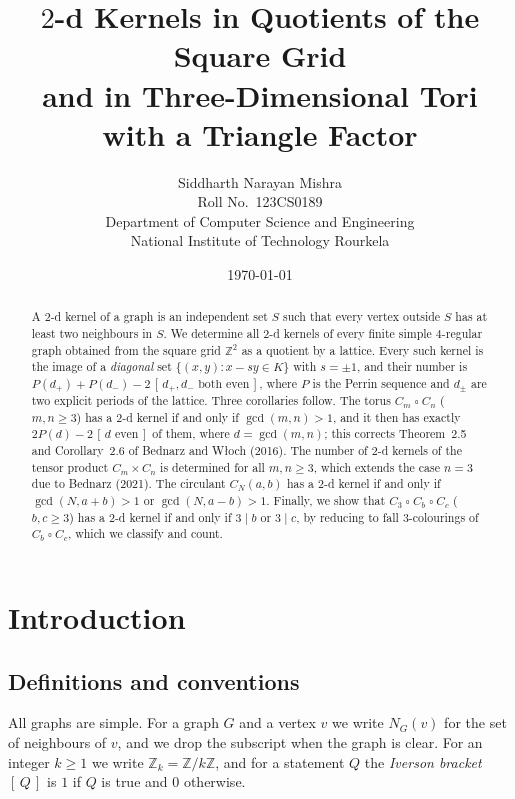 \documentclass[11pt]{article}
\title{$2$-d Kernels in Quotients of the Square Grid\\
and in Three-Dimensional Tori with a Triangle Factor}
\author{%
  Siddharth Narayan Mishra\\[0.2em]
  \small Roll No.\ 123CS0189\\
  \small Department of Computer Science and Engineering\\
  \small National Institute of Technology Rourkela%
}
\date{\today}
\theoremstyle{plain}
\theoremstyle{definition}
\theoremstyle{remark}
\newcommand{\Z}{\mathbb{Z}}
\newcommand{\T}{\mathbin{\square}}
\newcommand{\Per}{P}
\newcommand{\Iv}[1]{[\,#1\,]}
\begin{document}
\maketitle

\begin{abstract}
A $2$-d kernel of a graph is an independent set $S$ such that every vertex outside $S$ has
at least two neighbours in $S$. We determine all $2$-d kernels of every finite simple
$4$-regular graph obtained from the square grid $\Z^2$ as a quotient by a lattice. Every
such kernel is the image of a \emph{diagonal} set $\{(x,y) : x - sy \in K\}$ with
$s = \pm 1$, and their number is
$\Per(d_{+}) + \Per(d_{-}) - 2\,\Iv{d_{+}, d_{-} \text{ both even}}$, where $\Per$ is the
Perrin sequence and $d_{\pm}$ are two explicit periods of the lattice. Three corollaries
follow. The torus $C_m \T C_n$ ($m,n \ge 3$) has a $2$-d kernel if and only if
$\gcd(m,n) > 1$, and it then has exactly $2\Per(d) - 2\,\Iv{d \text{ even}}$ of them, where
$d = \gcd(m,n)$; this corrects Theorem~2.5 and Corollary~2.6 of Bednarz and W{\l}och
(2016). The number of $2$-d kernels of the tensor product $C_m \times C_n$ is determined for
all $m,n \ge 3$, which extends the case $n = 3$ due to Bednarz (2021). The circulant
$C_N(a,b)$ has a $2$-d kernel if and only if $\gcd(N, a+b) > 1$ or $\gcd(N, a-b) > 1$.
Finally, we show that $C_3 \T C_b \T C_c$ ($b, c \ge 3$) has a $2$-d kernel if and only if
$3 \mid b$ or $3 \mid c$, by reducing to fall $3$-colourings of $C_b \T C_c$, which we
classify and count.
\end{abstract}

\tableofcontents

\section{Introduction}\label{sec:intro}

\subsection{Definitions and conventions}

All graphs are simple. For a graph $G$ and a vertex $v$ we write $N_G(v)$ for the set of
neighbours of $v$, and we drop the subscript when the graph is clear. For an integer $k \ge 1$
we write $\Z_k = \Z/k\Z$, and for a statement $Q$ the \emph{Iverson bracket} $\Iv{Q}$ is $1$
if $Q$ is true and $0$ otherwise.
\end{document}
